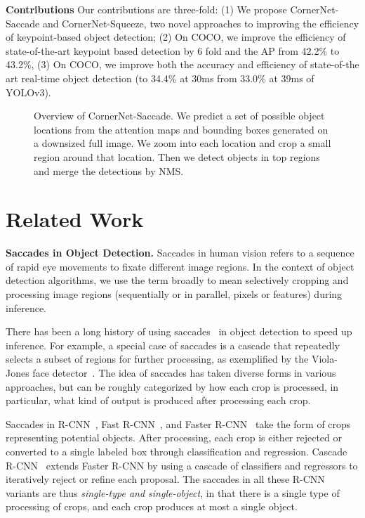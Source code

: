 \documentclass{bmvc2k}
\begin{document}
\smallskip \noindent \textbf{Contributions} Our contributions are three-fold: (1) We propose CornerNet-Saccade and CornerNet-Squeeze, two novel approaches to improving the efficiency of keypoint-based object detection; (2) On COCO, we improve the efficiency of state-of-the-art keypoint based detection by 6 fold and the AP from 42.2\% to 43.2\%, (3) On COCO, we improve both the accuracy and efficiency of state-of-the art real-time object detection (to 34.4\% at 30ms from 33.0\% at 39ms of YOLOv3).

\begin{figure}
    \centering
    \caption{Overview of CornerNet-Saccade. We predict a set of possible object locations from the attention maps and bounding boxes generated on a downsized full image. We zoom into each location and crop a small region around that location. Then we detect objects in top  regions and merge the detections by NMS.}
    \label{fig:overview}
    \vspace{-3mm}
\end{figure}

\section{Related Work}
\smallskip \noindent \textbf{Saccades in Object Detection.} 
Saccades in human vision refers to a sequence of rapid eye movements to fixate different image regions. In the context of object detection algorithms, we use the term broadly to mean selectively cropping and processing image regions (sequentially or in parallel, pixels or features) during inference. 

There has been a long history of using saccades~\cite{gualdi2011multistage,pedersoli2010recursive,zhang2007real} in object detection to speed up inference. For example, a special case of saccades is a cascade that repeatedly selects a subset of regions for further processing, as exemplified by the Viola-Jones face detector~\cite{viola2001rapid}. 
The idea of saccades has taken diverse forms in various approaches, but can be roughly categorized by how each crop is processed, in particular, what kind of output is produced after processing each crop. 

Saccades in R-CNN~\cite{girshick2014rich}, Fast R-CNN~\cite{girshick2015fast}, and Faster R-CNN~\cite{ren2015faster} take the form of crops representing potential objects. After processing, each crop is either rejected or converted to a single labeled box through classification and regression. Cascade R-CNN~\cite{cai2018cascade} extends Faster R-CNN by using a cascade of classifiers and regressors to iteratively reject or refine each proposal. The saccades in all these R-CNN variants  are thus \emph{single-type and single-object}, in that there is a single type of processing of crops, and each crop produces at most a single object. 
\end{document}
